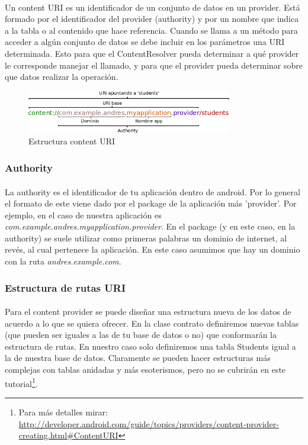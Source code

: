 \documentclass[10pt]{extarticle}
\begin{document}
\paragraph{}
Un content URI es un identificador de un conjunto de datos en un provider. Está formado por el identificador del provider (authority) y por un nombre que indica a la tabla o al contenido que hace referencia. Cuando se llama a un método para acceder a algún conjunto de datos se debe incluir en los parámetros una URI determinada. Esto para que el ContentResolver pueda determinar a qué provider le corresponde manejar el llamado, y para que el provider pueda determinar sobre que datos realizar la operación.

\begin{figure}[H]
    \centering
    \includegraphics[width=0.8\textwidth]{provider_uri_explicacion.png}
    \caption{Estructura content URI}
    \label{fig:estructura_content_URI}
\end{figure}



\subsubsection{Authority}

\paragraph{}
La authority es el identificador de tu aplicación dentro de android. Por lo general el formato de este viene dado por el package de la aplicación más 'provider'. Por ejemplo, en el caso de nuestra aplicación es \textit{com.example.andres.myapplication.provider}. En el package (y en este caso, en la authority) se suele utilizar como primeras palabras un dominio de internet, al revés, al cual pertenece la aplicación. En este caso asumimos que hay un dominio con la ruta \textit{andres.example.com}.

\subsubsection{Estructura de rutas URI}

\paragraph{}
Para el content provider se puede diseñar una estructura nueva de los datos de acuerdo a lo que se quiera ofrecer. En la clase contrato definiremos nuevas tablas (que pueden ser iguales a las de tu base de datos o no) que conformarán la estructura de rutas. En nuestro caso solo definiremos una tabla Students igual a la de nuestra base de datos. Claramente se pueden hacer estructuras más complejas con tablas anidadas y más esoterismos, pero no se cubrirán en este tutorial\footnote{Para más detalles mirar: \url{http://developer.android.com/guide/topics/providers/content-provider-creating.html\#ContentURI}}.
\end{document}
